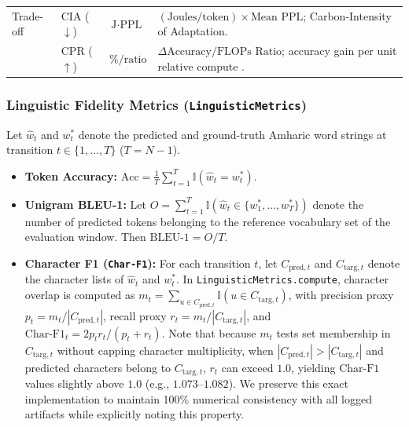 \documentclass{interact}
\begin{document}
\begin{table}[htbp]
{{\begin{tabular}{@{}lllp{6.2cm}@{}}
        \addlinespace
        Trade-off         & CIA ($\downarrow$)                             & $\text{J} \cdot \text{PPL}$ & $(\text{Joules/token}) \times \text{Mean PPL}$; Carbon-Intensity of Adaptation.                              \\
                          & CPR ($\uparrow$)                               & $\% / \text{ratio}$         & $\Delta\text{Accuracy} / \text{FLOPs Ratio}$; accuracy gain per unit relative compute \cite{ref13}.          \\
        \bottomrule
    \end{tabular}}}
    \label{tab:metrics}
\end{table}

\subsubsection{Linguistic Fidelity Metrics (\texttt{LinguisticMetrics})}

Let $\hat{w}_t$ and $w_t^{*}$ denote the predicted and ground-truth Amharic word strings at transition $t \in \{1, \dots, T\}$ ($T = N-1$).
\begin{itemize}
    \item \textbf{Token Accuracy:} $\text{Acc} = \frac{1}{T} \sum_{t=1}^{T} \mathbb{I}(\hat{w}_t = w_t^{*})$.
    \item \textbf{Unigram BLEU-1:} Let $O = \sum_{t=1}^{T} \mathbb{I}(\hat{w}_t \in \{w_1^{*}, \dots, w_T^{*}\})$ denote the number of predicted tokens belonging to the reference vocabulary set of the evaluation window. Then $\text{BLEU-1} = O / T$.
    \item \textbf{Character F1 (\texttt{Char-F1}):} For each transition $t$, let $C_{\text{pred},t}$ and $C_{\text{targ},t}$ denote the character lists of $\hat{w}_t$ and $w_t^{*}$. In \texttt{LinguisticMetrics.compute}, character overlap is computed as $m_t = \sum_{u \in C_{\text{pred},t}} \mathbb{I}(u \in C_{\text{targ},t})$, with precision proxy $p_t = m_t / |C_{\text{pred},t}|$, recall proxy $r_t = m_t / |C_{\text{targ},t}|$, and $\text{Char-F1}_t = 2 p_t r_t / (p_t + r_t)$. Note that because $m_t$ tests set membership in $C_{\text{targ},t}$ without capping character multiplicity, when $|C_{\text{pred},t}| > |C_{\text{targ},t}|$ and predicted characters belong to $C_{\text{targ},t}$, $r_t$ can exceed $1.0$, yielding $\text{Char-F1}$ values slightly above $1.0$ (e.g., $1.073$--$1.082$). We preserve this exact implementation to maintain 100\% numerical consistency with all logged artifacts while explicitly noting this property.
\end{itemize}
\end{document}

